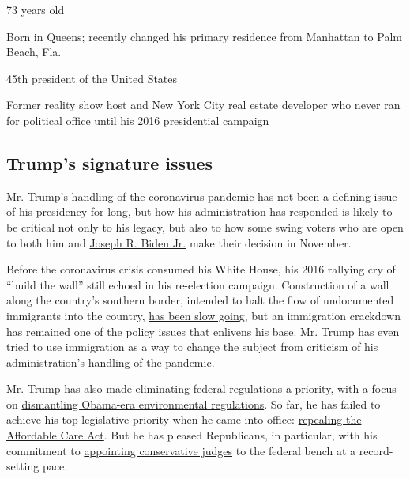 73 years old

Born in Queens; recently changed his primary residence from Manhattan to
Palm Beach, Fla.

45th president of the United States

Former reality show host and New York City real estate developer who
never ran for political office until his 2016 presidential campaign

\hypertarget{trumps-signature-issues}{%
\subsection{Trump's signature issues}\label{trumps-signature-issues}}

Mr. Trump's handling of the coronavirus pandemic has not been a defining
issue of his presidency for long, but how his administration has
responded is likely to be critical not only to his legacy, but also to
how some swing voters who are open to both him and
\href{https://www.nytimes3xbfgragh.onion/interactive/2020/us/elections/joe-biden.html}{Joseph
R. Biden Jr.} make their decision in November.

Before the coronavirus crisis consumed his White House, his 2016
rallying cry of ``build the wall'' still echoed in his re-election
campaign. Construction of a wall along the country's southern border,
intended to halt the flow of undocumented immigrants into the country,
\href{https://www.nytimes3xbfgragh.onion/2019/11/08/us/border-wall-texas.html}{has
been slow going}, but an immigration crackdown has remained one of the
policy issues that enlivens his base. Mr. Trump has even tried to use
immigration as a way to change the subject from criticism of his
administration's handling of the pandemic.

Mr. Trump has also made eliminating federal regulations a priority, with
a focus on
\href{https://www.nytimes3xbfgragh.onion/interactive/2019/climate/trump-environment-rollbacks.html}{dismantling
Obama-era environmental regulations}. So far, he has failed to achieve
his top legislative priority when he came into office:
\href{https://www.nytimes3xbfgragh.onion/2019/05/01/health/unconstitutional-trump-aca.html}{repealing
the Affordable Care Act}. But he has pleased Republicans, in particular,
with his commitment to
\href{https://www.nytimes3xbfgragh.onion/2020/03/14/us/trump-appeals-court-judges.html}{appointing
conservative judges} to the federal bench at a record-setting pace.

